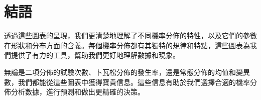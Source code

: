 \documentclass[12pt, a4paper]{article}
\begin{document}
\section{結語}
透過這些圖表的呈現，我們更清楚地理解了不同機率分佈的特性，以及它們的參數在形狀和分布方面的含義。每個機率分佈都有其獨特的規律和特點，這些圖表為我們提供了有力的工具，幫助我們更好地理解數據和現象。

無論是二項分佈的試驗次數、卜瓦松分佈的發生率，還是常態分佈的均值和變異數，我們都能從這些圖表中獲得寶貴信息。這些信息有助於我們選擇合適的機率分佈分析數據，進行預測和做出更精確的決策。
\end{document}
